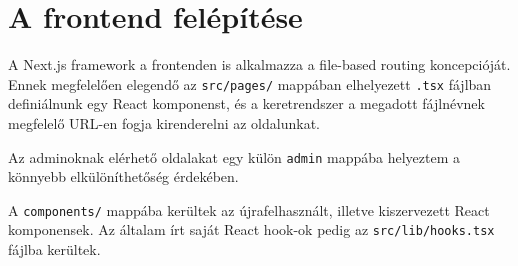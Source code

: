 \section{A frontend felépítése}

A Next.js framework a frontenden is alkalmazza a file-based routing koncepcióját. Ennek megfelelően elegendő az \lstinline|src/pages/|
mappában elhelyezett \lstinline|.tsx| fájlban definiálnunk egy React komponenst, és a keretrendszer a megadott fájlnévnek megfelelő URL-en
fogja kirenderelni az oldalunkat.

Az adminoknak elérhető oldalakat egy külön \lstinline|admin| mappába helyeztem a könnyebb elkülöníthetőség érdekében.

A \lstinline|components/| mappába kerültek az újrafelhasznált, illetve kiszervezett React komponensek.
Az általam írt saját React hook-ok pedig az \lstinline|src/lib/hooks.tsx| fájlba kerültek.
